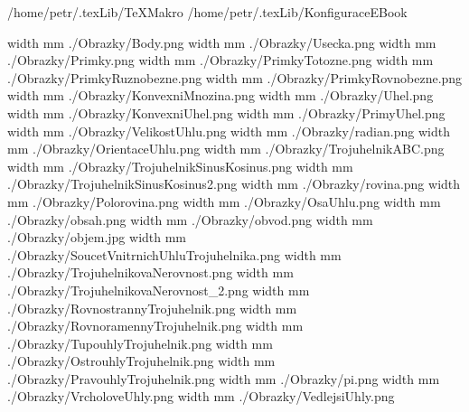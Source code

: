 \def\addr{/home/petr/.texLib}

 \addr/TeXMakro
\setAddress{\addr}
 \addr/KonfiguraceEBook

\pdfximage width \the\SirkaOdstavce mm {./Obrazky/Body.png}
\pdfximage width \the\SirkaOdstavce mm {./Obrazky/Usecka.png}
\pdfximage width \the\SirkaOdstavce mm {./Obrazky/Primky.png}
\pdfximage width \the\SirkaOdstavce mm {./Obrazky/PrimkyTotozne.png}
\pdfximage width \the\SirkaOdstavce mm {./Obrazky/PrimkyRuznobezne.png}
\pdfximage width \the\SirkaOdstavce mm {./Obrazky/PrimkyRovnobezne.png}
\pdfximage width \the\SirkaOdstavce mm {./Obrazky/KonvexniMnozina.png}
\pdfximage width \the\SirkaOdstavce mm {./Obrazky/Uhel.png}
\pdfximage width \the\SirkaOdstavce mm {./Obrazky/KonvexniUhel.png}
\pdfximage width \the\SirkaOdstavce mm {./Obrazky/PrimyUhel.png}
\pdfximage width \the\SirkaOdstavce mm {./Obrazky/VelikostUhlu.png}
\pdfximage width \the\SirkaOdstavce mm {./Obrazky/radian.png}
\pdfximage width \the\SirkaOdstavce mm {./Obrazky/OrientaceUhlu.png}
\pdfximage width \the\SirkaOdstavce mm {./Obrazky/TrojuhelnikABC.png}
\pdfximage width \the\SirkaOdstavce mm {./Obrazky/TrojuhelnikSinusKosinus.png}
\pdfximage width \the\SirkaOdstavce mm {./Obrazky/TrojuhelnikSinusKosinus2.png}
\pdfximage width \the\SirkaOdstavce mm {./Obrazky/rovina.png}
\pdfximage width \the\SirkaOdstavce mm {./Obrazky/Polorovina.png}
\pdfximage width \the\SirkaOdstavce mm {./Obrazky/OsaUhlu.png}
\pdfximage width \the\SirkaOdstavce mm {./Obrazky/obsah.png}
\pdfximage width \the\SirkaOdstavce mm {./Obrazky/obvod.png}
\pdfximage width \the\SirkaOdstavce mm {./Obrazky/objem.jpg}
\pdfximage width \the\SirkaOdstavce mm {./Obrazky/SoucetVnitrnichUhluTrojuhelnika.png}
\pdfximage width \the\SirkaOdstavce mm {./Obrazky/TrojuhelnikovaNerovnost.png}
\pdfximage width \the\SirkaOdstavce mm {./Obrazky/TrojuhelnikovaNerovnost_2.png}
\pdfximage width \the\SirkaOdstavce mm {./Obrazky/RovnostrannyTrojuhelnik.png}
\pdfximage width \the\SirkaOdstavce mm {./Obrazky/RovnoramennyTrojuhelnik.png}
\pdfximage width \the\SirkaOdstavce mm {./Obrazky/TupouhlyTrojuhelnik.png}
\pdfximage width \the\SirkaOdstavce mm {./Obrazky/OstrouhlyTrojuhelnik.png}
\pdfximage width \the\SirkaOdstavce mm {./Obrazky/PravouhlyTrojuhelnik.png}
\pdfximage width \the\SirkaOdstavce mm {./Obrazky/pi.png}
\pdfximage width \the\SirkaOdstavce mm {./Obrazky/VrcholoveUhly.png}
\pdfximage width \the\SirkaOdstavce mm {./Obrazky/VedlejsiUhly.png}
